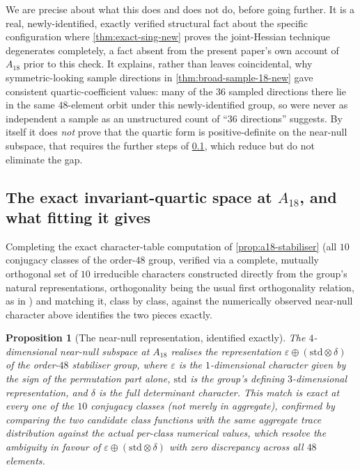 \documentclass[11pt,reqno]{amsart}
\renewcommand{\_}{\origunderscore\allowbreak}
\numberwithin{equation}{section}
\theoremstyle{plain}
\newtheorem{prop}[thm]{Proposition}
\theoremstyle{definition}
\theoremstyle{remark}
\begin{document}
We are precise about what this does and does not do, before going
further. It is a real, newly-identified, exactly verified structural
fact about the specific configuration where \cref{thm:exact-sing-new}
proves the joint-Hessian technique degenerates completely, a fact
absent from the present
paper's own account of $A_{18}$ prior to this check. It explains, rather
than leaves coincidental, why symmetric-looking sample directions in
\cref{thm:broad-sample-18-new} gave consistent quartic-coefficient
values: many of the $36$ sampled directions there lie in the same
$48$-element orbit under this newly-identified group, so were never as
independent a sample as an unstructured count of ``$36$ directions''
suggests. By itself it does \emph{not} prove that the quartic form is
positive-definite on the near-null subspace, that requires the further
steps of \cref{sec:a18-invariant-quartics}, which reduce but do not
eliminate the gap.

\subsection{The exact invariant-quartic space at \texorpdfstring{$A_{18}$}{A18}, and what fitting it gives}\label{sec:a18-invariant-quartics}

Completing the exact character-table computation of
\cref{prop:a18-stabiliser} (all $10$ conjugacy classes of the order-$48$
group, verified via a complete, mutually orthogonal set of $10$
irreducible characters constructed directly from the group's natural
representations, orthogonality being the usual first orthogonality
relation, as in \cite[\S2.3]{Ser77}) and matching it, class by class,
against the numerically observed near-null character above identifies the
two pieces exactly.

\begin{prop}[The near-null representation, identified exactly]\label{prop:a18-nullspace-irrep}
The $4$-dimensional near-null subspace at $A_{18}$ realises the
representation $\varepsilon\oplus(\mathrm{std}\otimes\delta)$ of the
order-$48$ stabiliser group, where $\varepsilon$ is the $1$-dimensional
character given by the sign of the permutation part alone, $\mathrm{std}$
is the group's defining $3$-dimensional representation, and $\delta$ is
the full determinant character. This match is exact at every one of the
$10$ conjugacy classes (not merely in aggregate), confirmed by comparing
the two candidate class functions with the same aggregate trace
distribution against the actual per-class numerical values, which
resolve the ambiguity in favour of $\varepsilon\oplus(\mathrm{std}\otimes\delta)$
with zero discrepancy across all $48$ elements.
\end{prop}
\end{document}

